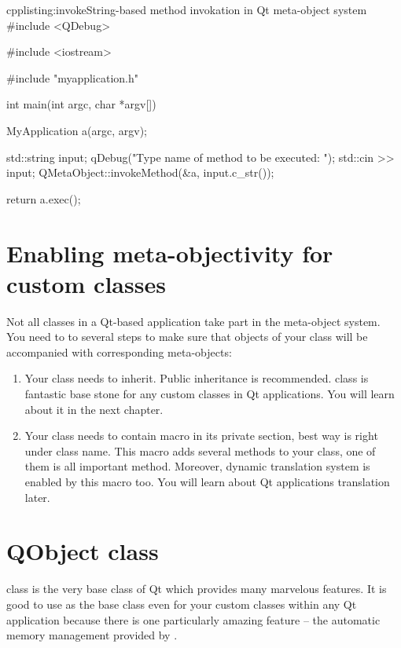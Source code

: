 \begin{fdoccode}{cpp}{listing:invoke}{String-based method invokation in Qt meta-object system}
#include <QDebug>

#include <iostream>

#include "myapplication.h"


int main(int argc, char *argv[]){
    MyApplication a(argc, argv);
    
    std::string input;
    qDebug("Type name of method to be executed: ");
    std::cin >> input;
    QMetaObject::invokeMethod(&a, input.c_str());

    return a.exec();
}
\end{fdoccode}

\section{Enabling meta-objectivity for custom classes}
Not all classes in a Qt-based application take part in the meta-object system. You need to to several steps to make sure that objects of your class will be accompanied with corresponding meta-objects:

\begin{enumerate}
\item Your class needs to inherit. Public inheritance is recommended. class is fantastic base stone for any custom classes in Qt applications. You will learn about it in the next chapter.
\item Your class needs to contain macro in its private section, best way is right under class name. This macro adds several methods to your class, one of them is all important method. Moreover, dynamic translation system is enabled by this macro too. You will learn about Qt applications translation later.
\end{enumerate}

\section{QObject class}
 class is the very base class of Qt which provides many marvelous features. It is good to use as the base class even for your custom classes within any Qt application because there is one particularly amazing feature -- the automatic memory management provided by .

